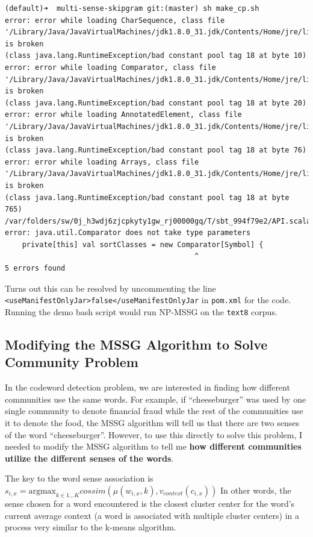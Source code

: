 \begin{lstlisting}
(default)➜  multi-sense-skipgram git:(master) sh make_cp.sh
error: error while loading CharSequence, class file '/Library/Java/JavaVirtualMachines/jdk1.8.0_31.jdk/Contents/Home/jre/lib/rt.jar(java/lang/CharSequence.class)' is broken
(class java.lang.RuntimeException/bad constant pool tag 18 at byte 10)
error: error while loading Comparator, class file '/Library/Java/JavaVirtualMachines/jdk1.8.0_31.jdk/Contents/Home/jre/lib/rt.jar(java/util/Comparator.class)' is broken
(class java.lang.RuntimeException/bad constant pool tag 18 at byte 20)
error: error while loading AnnotatedElement, class file '/Library/Java/JavaVirtualMachines/jdk1.8.0_31.jdk/Contents/Home/jre/lib/rt.jar(java/lang/reflect/AnnotatedElement.class)' is broken
(class java.lang.RuntimeException/bad constant pool tag 18 at byte 76)
error: error while loading Arrays, class file '/Library/Java/JavaVirtualMachines/jdk1.8.0_31.jdk/Contents/Home/jre/lib/rt.jar(java/util/Arrays.class)' is broken
(class java.lang.RuntimeException/bad constant pool tag 18 at byte 765)
/var/folders/sw/0j_h3wdj6zjcpkyty1gw_rj00000gq/T/sbt_994f79e2/API.scala:424: error: java.util.Comparator does not take type parameters
	private[this] val sortClasses = new Comparator[Symbol] {
                                            ^
5 errors found
\end{lstlisting}

Turns out this can be resolved by uncommenting the line \lstinline{<useManifestOnlyJar>false</useManifestOnlyJar} in \texttt{pom.xml} for the code. Running the demo bash script would run NP-MSSG on the \texttt{text8} corpus.

\subsection{Modifying the MSSG Algorithm to Solve Community Problem}

In the codeword detection problem, we are interested in finding how different communities use the same words. For example, if ``cheeseburger'' was used by one single community to denote financial fraud while the rest of the communities use it to denote the food, the MSSG algorithm will tell us that there are two senses of the word ``cheeseburger''. However, to use this directly to solve this problem, I needed to modify the MSSG algorithm to tell me \textbf{how different communities utilize the different senses of the words}.

The key to the word sense association is $s_{i,x} = \mathrm{argmax}_{k \in 1 ... K} cossim(\mu(w_{i,x}, k), v_{context}(c_{i,x}))$ In other words, the sense chosen for a word encountered is the closest cluster center for the word's current average context (a word is associated with multiple cluster centers) in a process very similar to the k-means algorithm.

